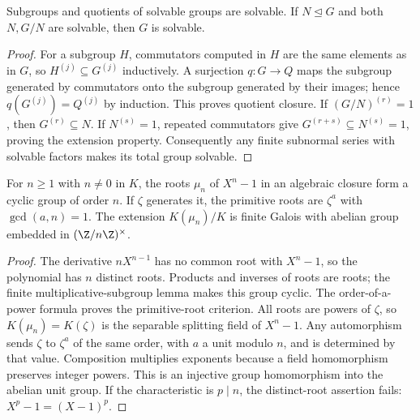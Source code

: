 \begin{theorem}
Subgroups and quotients of solvable groups are solvable. If $N\trianglelefteq G$ and both $N,G/N$ are solvable, then $G$ is solvable.
\end{theorem}
\begin{proof}
For a subgroup $H$, commutators computed in $H$ are the same elements as in $G$, so $H^{(j)}\subseteq G^{(j)}$ inductively. A surjection $q:G\to Q$ maps the subgroup generated by commutators onto the subgroup generated by their images; hence $q(G^{(j)})=Q^{(j)}$ by induction. This proves quotient closure. If $(G/N)^{(r)}=1$, then $G^{(r)}\subseteq N$. If $N^{(s)}=1$, repeated commutators give $G^{(r+s)}\subseteq N^{(s)}=1$, proving the extension property. Consequently any finite subnormal series with solvable factors makes its total group solvable.
\end{proof}

\begin{theorem}
For $n\geq1$ with $n\ne0$ in $K$, the roots $\mu_n$ of $X^n-1$ in an algebraic closure form a cyclic group of order $n$. If $\zeta$ generates it, the primitive roots are $\zeta^a$ with $\gcd(a,n)=1$. The extension $K(\mu_n)/K$ is finite Galois with abelian group embedded in $(\Z/n\Z)^\times$.
\end{theorem}
\begin{proof}
The derivative $nX^{n-1}$ has no common root with $X^n-1$, so the polynomial has $n$ distinct roots. Products and inverses of roots are roots; the finite multiplicative-subgroup lemma makes this group cyclic. The order-of-a-power formula proves the primitive-root criterion. All roots are powers of $\zeta$, so $K(\mu_n)=K(\zeta)$ is the separable splitting field of $X^n-1$. Any automorphism sends $\zeta$ to $\zeta^a$ of the same order, with $a$ a unit modulo $n$, and is determined by that value. Composition multiplies exponents because a field homomorphism preserves integer powers. This is an injective group homomorphism into the abelian unit group. If the characteristic is $p\mid n$, the distinct-root assertion fails: $X^p-1=(X-1)^p$.
\end{proof}

